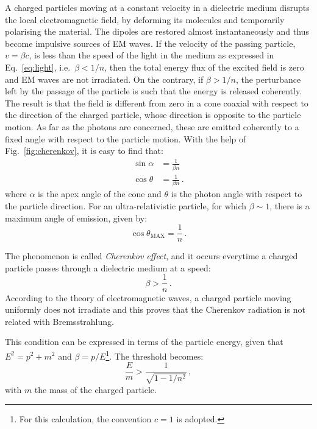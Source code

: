A charged particles moving at a constant velocity in a dielectric medium disrupts the local electromagnetic field, %
by deforming its molecules and temporarily polarising the material.
The dipoles are restored almost instantaneously and thus become impulsive sources of EM waves.
If the velocity of the passing particle, $v = \beta c$, is less than the speed of the light in the medium %
as expressed in Eq.~\ref{eq:light}, i.e.\ $\beta < 1/n$, then the total energy flux of the excited %
field is zero and EM waves are not irradiated.
On the contrary, if $\beta > 1/n$, the perturbance left by the passage of the particle is such that %
the energy is released coherently.
The result is that the field is different from zero in a cone coaxial with respect to the direction of %
the charged particle, whose direction is opposite to the particle motion.
As far as the photons are concerned, these are emitted coherently to a fixed angle with respect %
to the particle motion.
With the help of Fig.~\ref{fig:cherenkov}, it is easy to find that:
\begin{align}
	\sin \alpha &= \frac{1}{\beta n}\,\\
	\cos \theta &= \frac{1}{\beta n}\,.
\end{align}
where $\alpha$ is the apex angle of the cone and $\theta$ is the photon angle with respect to the particle direction.
For an ultra-relativistic particle, for which $\beta \sim 1$, there is a maximum angle of emission, given by:
\begin{equation}
	\cos \theta_{\mathrm{MAX}} = \frac{1}{n}\,.
\end{equation}

The phenomenon is called \emph{Cherenkov effect}, and it occurs everytime a charged particle passes through a %
dielectric medium at a speed:
\begin{equation}
	\label{eq:cherenkov}
	\beta > \frac{1}{n}\,.
\end{equation}
According to the theory of electromagnetic waves, a charged particle moving uniformly does not irradiate %
and this proves that the Cherenkov radiation is not related with Bremsstrahlung. 

This condition can be expressed in terms of the particle energy, given that $E^2 = p^2+m^2$ and %
$\beta = p/E$\footnote{For this calculation, the convention $c = 1$ is adopted.}.
The threshold becomes:
\begin{equation}
	\label{eq:ch_Eth}
	\frac{E}{m} > \frac{1}{\sqrt{1-1/n^2}}\,,
\end{equation}
with $m$ the mass of the charged particle.

